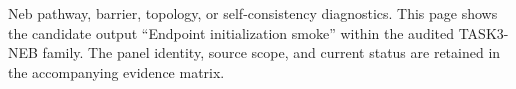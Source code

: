 Neb pathway, barrier, topology, or self-consistency diagnostics. This page shows the candidate output ``Endpoint initialization smoke'' within the audited TASK3-NEB family. The panel identity, source scope, and current status are retained in the accompanying evidence matrix.

